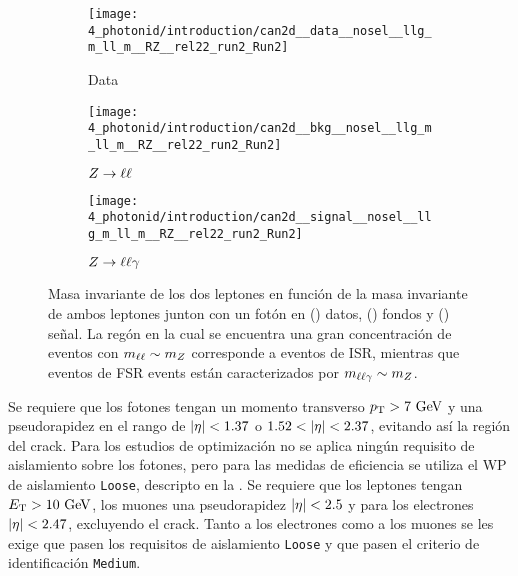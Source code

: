 \begin{figure}[ht!]
    \centering
    \begin{subfigure}[h]{0.32\linewidth}
        \centering
        \texttt{[image: 4\_photonid/introduction/can2d\_\_data\_\_nosel\_\_llg\_m\_ll\_m\_\_RZ\_\_rel22\_run2\_Run2]}
        \caption{Data}
        \label{fig:pid_ss:event_selection:mll_mlly_distribution:data}
    \end{subfigure}
    \hfill
    \begin{subfigure}[h]{0.32\linewidth}
        \centering
        \texttt{[image: 4\_photonid/introduction/can2d\_\_bkg\_\_nosel\_\_llg\_m\_ll\_m\_\_RZ\_\_rel22\_run2\_Run2]}
        \caption{\(Z\rightarrow \ell\ell\)}
        \label{fig:pid_ss:event_selection:mll_mlly_distribution:bkg}
    \end{subfigure}
    \hfill
    \begin{subfigure}[h]{0.32\linewidth}
        \centering
        \texttt{[image: 4\_photonid/introduction/can2d\_\_signal\_\_nosel\_\_llg\_m\_ll\_m\_\_RZ\_\_rel22\_run2\_Run2]}
        \caption{\(Z\rightarrow \ell\ell\gamma\)}
        \label{fig:pid_ss:event_selection:mll_mlly_distribution:signal}
    \end{subfigure}
    \caption{Masa invariante de los dos leptones en funci\'on de la masa invariante de ambos leptones junton con un fot\'on en () datos, () fondos y () se\~nal. La reg\'on en la cual se encuentra una gran concentraci\'on de eventos con \(m_{\ell\ell} \sim m_{Z}\) corresponde a eventos de \ac{ISR}, mientras que eventos de \ac{FSR} events est\'an caracterizados por \(m_{\ell\ell\gamma} \sim m_{Z}\).}
    \label{fig:pid_ss:event_selection:mll_mlly_distribution}
\end{figure}

Se requiere que los fotones tengan un momento transverso \(p_{\text{T}}>7~\text{GeV}\) y una pseudorapidez en el rango de \(|\eta|<1.37\) o \(1.52<\abseta<2.37\), evitando as\'i la región del crack.
Para los estudios de optimización no se aplica ningún requisito de aislamiento sobre los fotones, pero para las medidas de eficiencia se utiliza el \ac{WP} de aislamiento \texttt{Loose}, descripto en la \Sect{\ref{subsec:objects:egamma:iso}}. Se requiere que los leptones tengan \(E_{\text{T}}>10~\text{GeV}\), los muones una pseudorapidez \(|\eta|<2.5\) y para los electrones \(|\eta|<2.47\), excluyendo el crack. Tanto a los electrones como a los muones se les exige que pasen los requisitos de aislamiento \texttt{Loose} y que pasen el criterio de identificación \texttt{Medium}.

